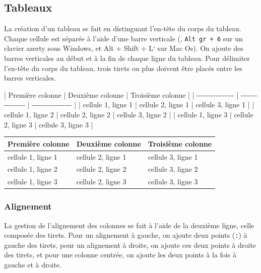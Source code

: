 \documentclass[
  11pt,
]{book}
\newenvironment{Shaded}{\begin{snugshade}}{\end{snugshade}}
\newcommand{\NormalTok}[1]{#1}
\numberwithin{equation}{section}
\numberwithin{countremarque}{section}
\begin{document}
\hypertarget{tableaux}{%
\subsection{Tableaux}\label{tableaux}}

La création d'un tableau se fait en distinguant l'en-tête du corps du tableau. Chaque cellule est séparée à l'aide d'une barre verticale (\texttt{\textbar{}}, \texttt{Alt\ gr\ +\ 6} sur un clavier azerty sous Windows, et Alt + Shift + L` sur Mac Os). On ajoute des barres verticales au début et à la fin de chaque ligne du tableau. Pour délimiter l'en-tête du corps du tableau, trois tirets ou plus doivent être placés entre les barres verticales.

\begin{Shaded}
\begin{Highlighting}[]
\NormalTok{| Première colonne | Deuxième colonne | Troisième colonne |}
\NormalTok{| {-}{-}{-}{-}{-}{-}{-}{-}{-}{-}{-}{-}{-}{-}{-}{-} | {-}{-}{-}{-}{-}{-}{-}{-}{-}{-}{-}{-}{-}{-}{-}{-} | {-}{-}{-}{-}{-}{-}{-}{-}{-}{-}{-}{-}{-}{-}{-}{-}{-} |}
\NormalTok{| cellule 1, ligne 1 | cellule 2, ligne 1 | cellule 3, ligne 1 |}
\NormalTok{| cellule 1, ligne 2 | cellule 2, ligne 2 | cellule 3, ligne 2 |}
\NormalTok{| cellule 1, ligne 3 | cellule 2, ligne 3 | cellule 3, ligne 3 |}
\end{Highlighting}
\end{Shaded}

\begin{longtable}[]{@{}lll@{}}
\toprule\noalign{}
Première colonne & Deuxième colonne & Troisième colonne \\
\midrule\noalign{}
\endhead
\bottomrule\noalign{}
\endlastfoot
cellule 1, ligne 1 & cellule 2, ligne 1 & cellule 3, ligne 1 \\
cellule 1, ligne 2 & cellule 2, ligne 2 & cellule 3, ligne 2 \\
cellule 1, ligne 3 & cellule 2, ligne 3 & cellule 3, ligne 3 \\
\end{longtable}

\hypertarget{alignement}{%
\subsubsection{Alignement}\label{alignement}}

La gestion de l'alignement des colonnes se fait à l'aide de la deuxième ligne, celle composée des tirets. Pour un alignement à gauche, on ajoute deux points (\texttt{:}) à gauche des tirets, pour un alignement à droite, on ajoute ces deux points à droite des tirets, et pour une colonne centrée, on ajoute les deux points à la fois à gauche et à droite.
\end{document}
